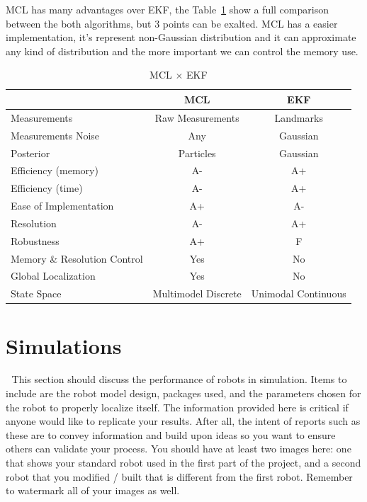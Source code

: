 \documentclass[10pt,journal,compsoc]{IEEEtran}
\begin{document}
MCL has many advantages over EKF, the Table~\ref{Tab:mclxekf} show a full comparison between the both algorithms, but 3
points can be exalted. MCL has a easier implementation, it's represent non-Gaussian distribution and it can approximate
any kind of distribution and the more important we can control the memory use.
\begin{table}[ht]
  \caption{MCL $\times$ EKF}
\begin{center}
  \begin{tabular}{l c c}
    \hline

    & MCL & EKF \\
    \hline
    Measurements & Raw Measurements & Landmarks\\
    Measurements Noise & Any & Gaussian \\
    Posterior & Particles & Gaussian \\
    Efficiency (memory) & A- & A+ \\
    Efficiency (time) & A- & A+ \\
    Ease of Implementation & A+ & A- \\
    Resolution & A- & A+\\
    Robustness & A+ & F \\
    Memory \& Resolution Control & Yes & No\\
    Global Localization & Yes & No \\

    State Space & Multimodel Discrete & Unimodal Continuous\\

    \hline
  \end{tabular}
  \label{Tab:mclxekf}
\end{center}
\end{table}

\section{Simulations}




This section should discuss the performance of robots in simulation. Items to include are the robot model design, packages used, and the parameters chosen for the robot to properly localize itself. The information provided here is critical if anyone would like to replicate your results. After all, the intent of reports such as these are to convey information and build upon ideas so you want to ensure others can validate your process.
You should have at least two images here: one that shows your standard robot used in the first part of the project, and a second robot that you modified / built that is different from the first robot. Remember to watermark all of your images as well. 
\end{document}

